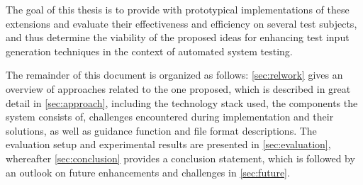The goal of this thesis is to provide \xmlmate with prototypical implementations of these extensions and
evaluate their effectiveness and efficiency on several test subjects, and thus determine the viability of the
proposed ideas for enhancing test input generation techniques in the context of automated system testing.


The remainder of this document is organized as follows: \cref{sec:relwork} gives an overview of approaches
related to the one proposed, which is described in great detail in \cref{sec:approach}, including the
technology stack used, the components the system consists of, challenges encountered during implementation and
their solutions, as well as guidance function and file format descriptions. The evaluation setup and
experimental results are presented in \cref{sec:evaluation}, whereafter \cref{sec:conclusion} provides a
conclusion statement, which is followed by an outlook on future enhancements and challenges in
\cref{sec:future}.
